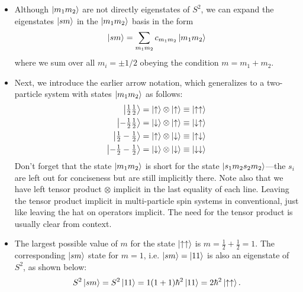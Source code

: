 \documentclass[11pt, a4paper]{article}
\newcommand{\ua}{\uparrow}  %
\newcommand{\da}{\downarrow}  %
\begin{document}
\begin{itemize}
    \item Although $ \ket{m_{1}m_{2}} $ are not directly eigenstates of $ S^{2} $, we can expand the eigenstates $ \ket{sm} $ in the $ \ket{m_{1}m_{2}} $ basis in the form
    \begin{equation*}
        \ket{sm} = \sum_{m_{1}m_{2}} c_{m_{1}m_{2}}\ket{m_{1}m_{2}}
    \end{equation*}
    where we sum over all $ m_{i} = \pm 1/2 $ obeying the condition $ m = m_{1} + m_{2} $. 
    
    \item Next, we introduce the earlier arrow notation, which generalizes to a two-particle system with states $ \ket{m_{1}m_{2}}  $ as follows:
    \begin{align*}
        \ket{\tfrac{1}{2}\tfrac{1}{2}} &= \ket{\ua} \otimes \ket{\ua} \equiv \ket{\ua\ua}\\
        \ket{-\tfrac{1}{2}\tfrac{1}{2}} &= \ket{\da} \otimes \ket{\ua} \equiv \ket{\da\ua}\\
        \ket{\tfrac{1}{2}-\tfrac{1}{2}} &= \ket{\ua} \otimes \ket{\da} \equiv \ket{\ua\da}\\
        \ket{-\tfrac{1}{2}-\tfrac{1}{2}} &= \ket{\da} \otimes \ket{\da} \equiv \ket{\da\da}
    \end{align*}
    Don't forget that the state $ \ket{m_{1}m_{2}} $ is short for the state $ \ket{s_{1}m_{2}s_{2}m_{2}} $---the $ s_{i} $ are left out for conciseness but are still implicitly there. Note also that we have left tensor product $ \otimes $ implicit in the last equality of each line. Leaving the tensor product implicit in multi-particle spin systems in conventional, just like leaving the hat on operators implicit. The need for the tensor product is usually clear from context.

    \item The largest possible value of $ m $ for the state $ \ket{\ua \ua} $ is $ m = \tfrac{1}{2} + \tfrac{1}{2} = 1 $. The corresponding $ \ket{sm} $ state for $ m = 1 $, i.e. $ \ket{sm} = \ket{11} $ is also an eigenstate of $ S^{2} $, as shown below:
    \begin{equation*}
        S^{2}\ket{sm} = S^{2}\ket{11} = 1(1 + 1)\hbar^{2}\ket{11} = 2\hbar^{2}\ket{\ua\ua}.
    \end{equation*}
    

\end{itemize}
\end{document}
